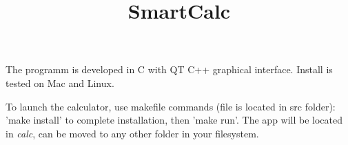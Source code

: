 \documentclass[a4paper]{article}
\begin{document}
\title{SmartCalc}
\maketitle

The programm is developed in C with QT C++ graphical interface. Install is tested on Mac and Linux. 
\\
\par
To launch the calculator, use makefile commands (file is located in src folder): 'make install' to complete installation, then 'make run'. The app will be located in \textit{calc}, can be moved to any other folder in your filesystem. 
\end{document}
